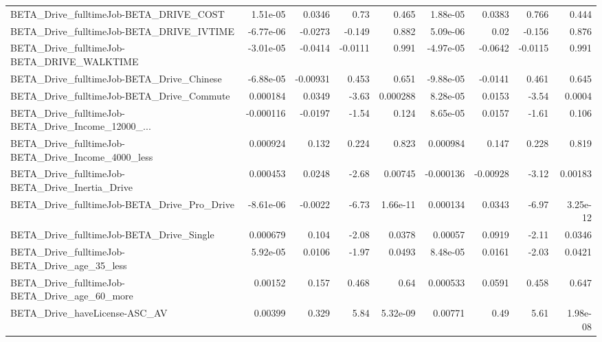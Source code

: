 \begin{tabular}{lrrrrrrrr}
BETA\_Drive\_fulltimeJob-BETA\_DRIVE\_COST             &    1.51e-05 &       0.0346 &     0.73 &    0.465 &   1.88e-05 &      0.0383 &        0.766 &         0.444 \\
BETA\_Drive\_fulltimeJob-BETA\_DRIVE\_IVTIME           &   -6.77e-06 &      -0.0273 &   -0.149 &    0.882 &   5.09e-06 &        0.02 &       -0.156 &         0.876 \\
BETA\_Drive\_fulltimeJob-BETA\_DRIVE\_WALKTIME         &   -3.01e-05 &      -0.0414 &  -0.0111 &    0.991 &  -4.97e-05 &     -0.0642 &      -0.0115 &         0.991 \\
BETA\_Drive\_fulltimeJob-BETA\_Drive\_Chinese          &   -6.88e-05 &     -0.00931 &    0.453 &    0.651 &  -9.88e-05 &     -0.0141 &        0.461 &         0.645 \\
BETA\_Drive\_fulltimeJob-BETA\_Drive\_Commute          &    0.000184 &       0.0349 &    -3.63 & 0.000288 &   8.28e-05 &      0.0153 &        -3.54 &        0.0004 \\
BETA\_Drive\_fulltimeJob-BETA\_Drive\_Income\_12000\_... &   -0.000116 &      -0.0197 &    -1.54 &    0.124 &   8.65e-05 &      0.0157 &        -1.61 &         0.106 \\
BETA\_Drive\_fulltimeJob-BETA\_Drive\_Income\_4000\_less &    0.000924 &        0.132 &    0.224 &    0.823 &   0.000984 &       0.147 &        0.228 &         0.819 \\
BETA\_Drive\_fulltimeJob-BETA\_Drive\_Inertia\_Drive    &    0.000453 &       0.0248 &    -2.68 &  0.00745 &  -0.000136 &    -0.00928 &        -3.12 &       0.00183 \\
BETA\_Drive\_fulltimeJob-BETA\_Drive\_Pro\_Drive        &   -8.61e-06 &      -0.0022 &    -6.73 & 1.66e-11 &   0.000134 &      0.0343 &        -6.97 &      3.25e-12 \\
BETA\_Drive\_fulltimeJob-BETA\_Drive\_Single           &    0.000679 &        0.104 &    -2.08 &   0.0378 &    0.00057 &      0.0919 &        -2.11 &        0.0346 \\
BETA\_Drive\_fulltimeJob-BETA\_Drive\_age\_35\_less      &    5.92e-05 &       0.0106 &    -1.97 &   0.0493 &   8.48e-05 &      0.0161 &        -2.03 &        0.0421 \\
BETA\_Drive\_fulltimeJob-BETA\_Drive\_age\_60\_more      &     0.00152 &        0.157 &    0.468 &     0.64 &   0.000533 &      0.0591 &        0.458 &         0.647 \\
BETA\_Drive\_haveLicense-ASC\_AV                      &     0.00399 &        0.329 &     5.84 & 5.32e-09 &    0.00771 &        0.49 &         5.61 &      1.98e-08 \\

\end{tabular}
